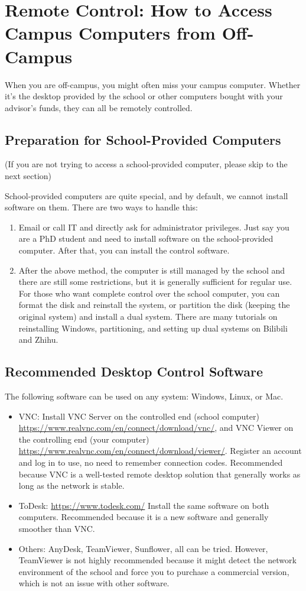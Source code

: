 \section{Remote Control: How to Access Campus Computers from Off-Campus}

When you are off-campus, you might often miss your campus computer. Whether it's the desktop provided by the school or other computers bought with your advisor's funds, they can all be remotely controlled.

\subsection{Preparation for School-Provided Computers}
(If you are not trying to access a school-provided computer, please skip to the next section)

School-provided computers are quite special, and by default, we cannot install software on them. There are two ways to handle this:
\begin{enumerate}
    \item Email or call IT and directly ask for administrator privileges. Just say you are a PhD student and need to install software on the school-provided computer. After that, you can install the control software.
    \item After the above method, the computer is still managed by the school and there are still some restrictions, but it is generally sufficient for regular use. For those who want complete control over the school computer, you can format the disk and reinstall the system, or partition the disk (keeping the original system) and install a dual system. There are many tutorials on reinstalling Windows, partitioning, and setting up dual systems on Bilibili and Zhihu.
\end{enumerate}

\subsection{Recommended Desktop Control Software}
The following software can be used on any system: Windows, Linux, or Mac.
\begin{itemize}
    \item VNC: Install VNC Server on the controlled end (school computer) \url{https://www.realvnc.com/en/connect/download/vnc/}, and VNC Viewer on the controlling end (your computer) \url{https://www.realvnc.com/en/connect/download/viewer/}. Register an account and log in to use, no need to remember connection codes. Recommended because VNC is a well-tested remote desktop solution that generally works as long as the network is stable.
    \item ToDesk: \url{https://www.todesk.com/} Install the same software on both computers. Recommended because it is a new software and generally smoother than VNC.
    \item Others: AnyDesk, TeamViewer, Sunflower, all can be tried. However, TeamViewer is not highly recommended because it might detect the network environment of the school and force you to purchase a commercial version, which is not an issue with other software.
\end{itemize}

